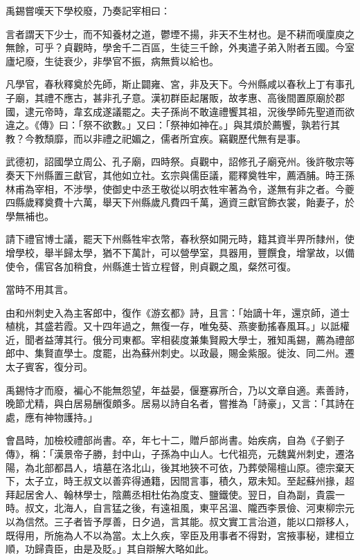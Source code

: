 \begin{pinyinscope}
 禹錫嘗嘆天下學校廢，乃奏記宰相曰：



 言者謂天下少士，而不知養材之道，鬱堙不揚，非天不生材也。是不耕而嘆廩庾之無餘，可乎？貞觀時，學舍千二百區，生徒三千餘，外夷遣子弟入附者五國。今室廬圮廢，生徒衰少，非學官不振，病無貲以給也。



 凡學官，春秋釋奠於先師，斯止闢雍、宮，非及天下。今州縣咸以春秋上丁有事孔子廟，其禮不應古，甚非孔子意。漢初群臣起屠販，故孝惠、高後間置原廟於郡國，逮元帝時，韋玄成遂議罷之。夫子孫尚不敢違禮饗其祖，況後學師先聖道而欲違之。《傳》曰：「祭不欲數。」又曰：「祭神如神在。」與其煩於薦饗，孰若行其教？今教頹靡，而以非禮之祀媚之，儒者所宜疾。竊觀歷代無有是事。



 武德初，詔國學立周公、孔子廟，四時祭。貞觀中，詔修孔子廟兗州。後許敬宗等奏天下州縣置三獻官，其他如立社。玄宗與儒臣議，罷釋奠牲牢，薦酒脯。時王孫林甫為宰相，不涉學，使御史中丞王敬從以明衣牲牢著為令，遂無有非之者。今夔四縣歲釋奠費十六萬，舉天下州縣歲凡費四千萬，適資三獻官飾衣裳，飴妻子，於學無補也。



 請下禮官博士議，罷天下州縣牲牢衣幣，春秋祭如開元時，籍其資半畀所隸州，使增學校，舉半歸太學，猶不下萬計，可以營學室，具器用，豐饌食，增掌故，以備使令，儒官各加稍食，州縣進士皆立程督，則貞觀之風，粲然可復。



 當時不用其言。



 由和州刺史入為主客郎中，復作《游玄都》詩，且言：「始謫十年，還京師，道士植桃，其盛若霞。又十四年過之，無復一存，唯兔葵、燕麥動搖春風耳。」以詆權近，聞者益薄其行。俄分司東都。宰相裴度兼集賢殿大學士，雅知禹錫，薦為禮部郎中、集賢直學士。度罷，出為蘇州刺史。以政最，賜金紫服。徙汝、同二州。遷太子賓客，復分司。



 禹錫恃才而廢，褊心不能無怨望，年益晏，偃蹇寡所合，乃以文章自適。素善詩，晚節尤精，與白居易酬復頗多。居易以詩自名者，嘗推為「詩豪」，又言：「其詩在處，應有神物護持。」



 會昌時，加檢校禮部尚書。卒，年七十二，贈戶部尚書。始疾病，自為《子劉子傳》，稱：「漢景帝子勝，封中山，子孫為中山人。七代祖亮，元魏冀州刺史，遷洛陽，為北部都昌人，墳墓在洛北山，後其地狹不可依，乃葬滎陽檀山原。德宗棄天下，太子立，時王叔文以善弈得通籍，因間言事，積久，眾未知。至起蘇州掾，超拜起居舍人、翰林學士，陰薦丞相杜佑為度支、鹽鐵使。翌日，自為副，貴震一時。叔文，北海人，自言猛之後，有遠祖風，東平呂溫、隴西李景儉、河東柳宗元以為信然。三子者皆予厚善，日夕過，言其能。叔文實工言治道，能以口辯移人，既得用，所施為人不以為當。太上久疾，宰臣及用事者不得對，宮掖事秘，建桓立順，功歸貴臣，由是及貶。」其自辯解大略如此。




\end{pinyinscope}
